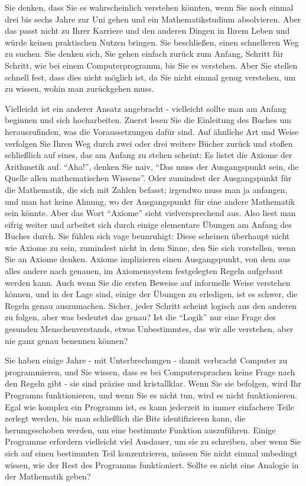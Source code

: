 Sie denken, dass Sie es wahrscheinlich verstehen könnten, wenn Sie noch einmal drei bis sechs Jahre zur Uni gehen und ein Mathematikstudium absolvieren.  Aber das passt nicht zu Ihrer Karriere und den anderen Dingen in Ihrem Leben und würde keinen praktischen Nutzen bringen.  Sie beschließen, einen schnelleren Weg zu suchen.  Sie denken sich, Sie gehen einfach zurück zum Anfang, Schritt für Schritt, wie bei einem Computerprogramm, bis Sie es verstehen.  Aber Sie stellen schnell fest, dass dies nicht möglich ist, da Sie nicht einmal genug verstehen, um zu wissen, wohin man zurückgehen muss.

Vielleicht ist ein anderer Ansatz angebracht - vielleicht sollte man am Anfang beginnen und sich hocharbeiten.  Zuerst lesen Sie die Einleitung des Buches um herauszufinden, was die Voraussetzungen dafür sind.  Auf ähnliche Art und Weise verfolgen Sie Ihren Weg durch zwei oder drei weitere Bücher zurück und stoßen schließlich auf eines, das am Anfang zu stehen scheint: Es listet die Axiome der Arithmetik auf.  "`Aha!"', denken Sie naiv, "`Das muss der Ausgangspunkt sein, die Quelle allen mathematischen Wissens"'. Oder zumindest der Ausgangspunkt für die Mathematik, die sich mit Zahlen befasst; irgendwo muss man ja anfangen, und man hat keine Ahnung, wo der Ausgangspunkt für eine andere Mathematik sein könnte.  Aber das Wort "`Axiome"' sieht vielversprechend aus.  Also liest man eifrig weiter und arbeitet sich durch einige elementare Übungen am Anfang des Buches durch.  Sie fühlen sich vage beunruhigt: Diese scheinen überhaupt nicht wie Axiome zu sein, zumindest nicht in dem Sinne, den Sie sich vorstellen, wenn Sie an Axiome denken.  Axiome implizieren einen Ausgangspunkt, von dem aus alles andere nach genauen, im Axiomensystem festgelegten Regeln aufgebaut werden kann.  Auch wenn Sie die ersten Beweise auf informelle Weise verstehen können, und in der Lage sind, einige der Übungen zu erledigen, ist es schwer, die Regeln genau auszumachen.   Sicher, jeder Schritt scheint logisch aus den anderen zu folgen, aber was bedeutet das genau?  Ist die "`Logik"' nur eine Frage des gesunden Menschenverstands, etwas Unbestimmtes, das wir alle verstehen, aber nie ganz genau benennen können?

Sie haben einige Jahre - mit Unterbrechungen - damit verbracht Computer zu programmieren, und Sie wissen, dass es bei Computersprachen keine Frage nach den Regeln gibt - sie sind präzise und kristallklar.  Wenn Sie sie befolgen, wird Ihr Programm funktionieren, und wenn Sie es nicht tun, wird es nicht funktionieren.  Egal wie komplex ein Programm ist, es kann jederzeit in immer einfachere Teile zerlegt werden, bis man schließlich die Bits identifizieren kann, die herumgeschoben werden, um eine bestimmte Funktion auszuführen.  Einige Programme erfordern vielleicht viel Ausdauer, um sie zu schreiben, aber wenn Sie sich auf einen bestimmten Teil konzentrieren, müssen Sie nicht einmal unbedingt wissen, wie der Rest des Programms funktioniert. Sollte es nicht eine Analogie in der Mathematik geben?

